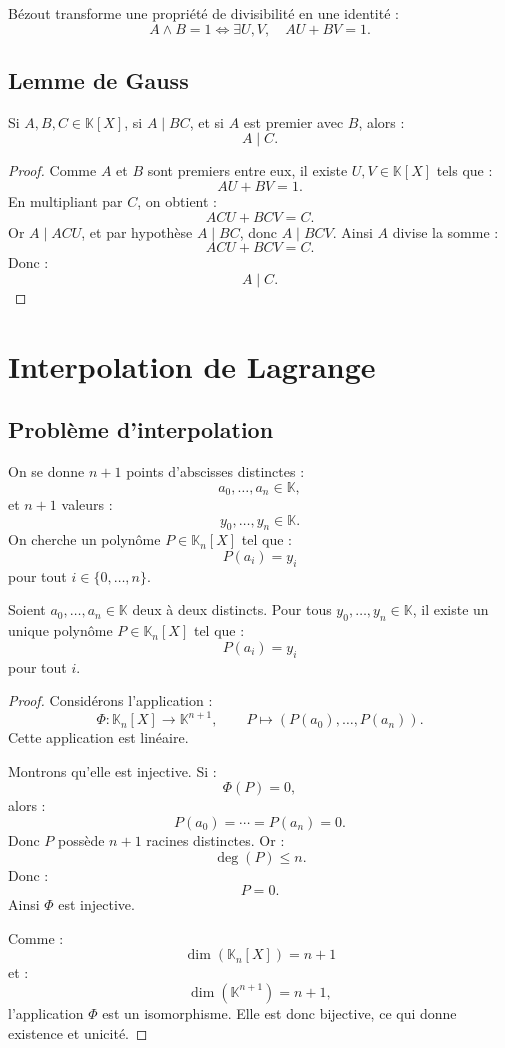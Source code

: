 \documentclass[11pt,a4paper]{article}
\newcommand{\K}{\mathbb K}
\begin{document}
\begin{retenirbox}
Bézout transforme une propriété de divisibilité en une identité :
\[
A\wedge B=1
\Longleftrightarrow
\exists U,V,\quad AU+BV=1.
\]
\end{retenirbox}

\subsection{Lemme de Gauss}

\begin{theorembox}
Si \(A,B,C\in\K[X]\), si \(A\mid BC\), et si \(A\) est premier avec \(B\), alors :
\[
A\mid C.
\]
\end{theorembox}

\begin{proof}
Comme \(A\) et \(B\) sont premiers entre eux, il existe \(U,V\in\K[X]\) tels que :
\[
AU+BV=1.
\]
En multipliant par \(C\), on obtient :
\[
ACU+BCV=C.
\]
Or \(A\mid ACU\), et par hypothèse \(A\mid BC\), donc \(A\mid BCV\).  
Ainsi \(A\) divise la somme :
\[
ACU+BCV=C.
\]
Donc :
\[
A\mid C.
\]
\end{proof}

\section{Interpolation de Lagrange}

\subsection{Problème d'interpolation}

On se donne \(n+1\) points d'abscisses distinctes :
\[
a_0,\dots,a_n\in\K,
\]
et \(n+1\) valeurs :
\[
y_0,\dots,y_n\in\K.
\]
On cherche un polynôme \(P\in\K_n[X]\) tel que :
\[
P(a_i)=y_i
\]
pour tout \(i\in\{0,\dots,n\}\).

\begin{theorembox}
Soient \(a_0,\dots,a_n\in\K\) deux à deux distincts.  
Pour tous \(y_0,\dots,y_n\in\K\), il existe un unique polynôme \(P\in\K_n[X]\) tel que :
\[
P(a_i)=y_i
\]
pour tout \(i\).
\end{theorembox}

\begin{proof}
Considérons l'application :
\[
\Phi:\K_n[X]\to\K^{n+1},
\qquad
P\mapsto(P(a_0),\dots,P(a_n)).
\]
Cette application est linéaire.

Montrons qu'elle est injective.  
Si :
\[
\Phi(P)=0,
\]
alors :
\[
P(a_0)=\cdots=P(a_n)=0.
\]
Donc \(P\) possède \(n+1\) racines distinctes.  
Or :
\[
\deg(P)\leq n.
\]
Donc :
\[
P=0.
\]
Ainsi \(\Phi\) est injective.

Comme :
\[
\dim(\K_n[X])=n+1
\]
et :
\[
\dim(\K^{n+1})=n+1,
\]
l'application \(\Phi\) est un isomorphisme.  
Elle est donc bijective, ce qui donne existence et unicité.
\end{proof}
\end{document}
